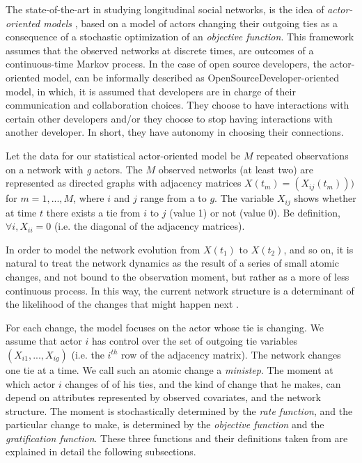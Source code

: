 \documentclass[11pt]{report}
\begin{document}
The state-of-the-art in studying longitudinal social networks, is the idea of \textit{actor-oriented models} \cite{Snijders2010}, based on a model of actors changing their outgoing ties as a consequence of a stochastic optimization of an \textit{objective function}. This framework assumes that the observed networks at discrete times, are outcomes of a continuous-time Markov process. In the case of open source developers, the actor-oriented model, can be informally described as OpenSourceDeveloper-oriented model, in which, it is assumed that developers are in charge of their communication and collaboration choices. They choose to have interactions with certain other developers and/or they choose to stop having interactions with another developer. In short, they have autonomy in choosing their connections.

Let the data for our statistical actor-oriented model be $M$ repeated observations on a network with \textit{g} actors. The $M$ observed networks (at least two) are represented as directed graphs with adjacency matrices $X(t_m) = (X_{ij}(t_m)))$ for $m = 1,...,M$, where $i$ and $j$ range from a to $g$. The variable $X_{ij}$ shows whether at time $t$ there exists a tie from $i$ to $j$ (value 1) or not (value 0). Be definition, $\forall i, X_{ii}=0$ (i.e. the diagonal of the adjacency matrices).

In order to model the network evolution from $X(t_1)$ to $X(t_2)$, and so on, it is natural to treat the network dynamics as the result of a series of small atomic changes, and not bound to the observation moment, but rather as a more of less continuous process. In this way, the current network structure is a determinant of the likelihood of the changes that might happen next \cite{Coleman1964}. 

For each change, the model focuses on the actor whose tie is changing. We assume that actor $i$ has control over the set of outgoing  tie variables $(X_{i1}, ..., X_{ig})$ (i.e. the $i^{th}$ row of the adjacency matrix). The network changes one tie at a time. We call such an atomic change a \textit{ministep}. The moment at which actor $i$ changes of of his ties, and the kind of change that he makes, can depend on attributes represented by observed covariates, and the network structure. The moment is stochastically determined by the \textit{rate function}, and the particular change to make, is determined by the \textit{objective function} and the \textit{gratification function}. These three functions and their definitions taken from \cite{Snijders2004} are explained in detail the following subsections.
\end{document}
